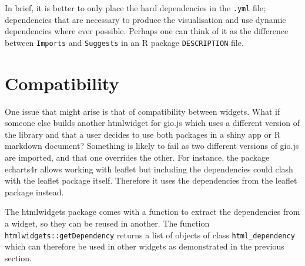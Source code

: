 \documentclass[
]{krantz}
\begin{document}
In brief, it is better to only place the hard dependencies in the \texttt{.yml} file; dependencies that are necessary to produce the visualisation and use dynamic dependencies where ever possible. Perhaps one can think of it as the difference between \texttt{Imports} and \texttt{Suggests} in an R package \texttt{DESCRIPTION} file.

\hypertarget{widgets-adv-compatibility}{%
\section{Compatibility}\label{widgets-adv-compatibility}}

One issue that might arise is that of compatibility between widgets. What if someone else builds another htmlwidget for gio.js which uses a different version of the library and that a user decides to use both packages in a shiny app or R markdown document? Something is likely to fail as two different versions of gio.js are imported, and that one overrides the other. For instance, the package echarts4r \citep{R-echarts4r} allows working with leaflet but including the dependencies could clash with the leaflet package itself. Therefore it uses the dependencies from the leaflet package instead.

The htmlwidgets package comes with a function to extract the dependencies from a widget, so they can be reused in another. The function \texttt{htmlwidgets::getDependency} returns a list of objects of class \texttt{html\_dependency} which can therefore be used in other widgets as demonstrated in the previous section.
\end{document}
